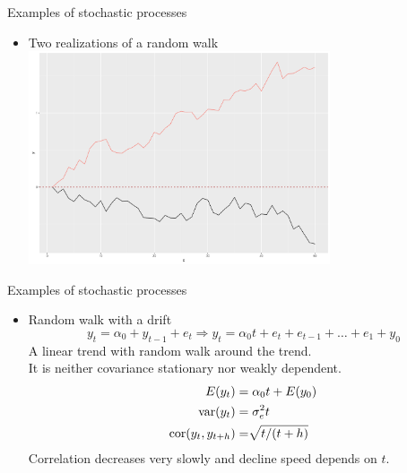 \documentclass{beamer}
\begin{document}

\begin{frame}{Examples of stochastic processes}
\begin{itemize}
\item Two realizations of a random walk \\
\vspace{0.5cm}
\includegraphics[width=0.7\textwidth]{img/random_walk.pdf}
\end{itemize}
\end{frame}


\begin{frame}{Examples of stochastic processes}
\begin{itemize}
\item Random walk with a drift
$$ y_t=\alpha_0+y_{t-1}+e_t \Rightarrow y_t =\alpha_0 t + e_{t} + e_{t-1} +  \dots +e_1 + y_0$$
A linear trend with random walk around the trend. \\ It is neither covariance stationary nor weakly dependent.
\begin{align}\nonumber
E(y_t) & =\alpha_0 t +E(y_0)\\\nonumber
\textnormal{var}(y_t) & =\sigma^2_e t\\\nonumber
\textnormal{cor}(y_t,y_{t+h}) & =\sqrt[]{t/(t+h)}
\end{align} 
Correlation decreases very slowly and decline speed depends on $t$.
\end{itemize}
\end{frame}

\end{document}
